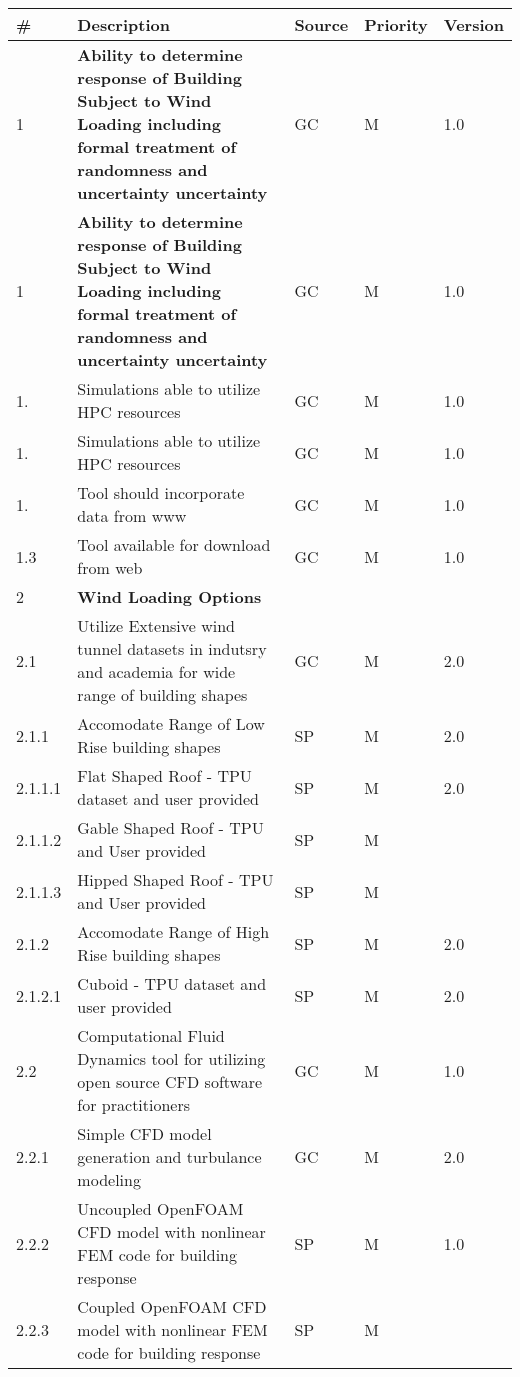 \begin{longtable}{| p{} | p{} | p{} | p{} |  p{} |}
                               \toprule
       \# & Description & Source & Priority & Version \\ \hline
1 & \textbf{Ability to determine response of Building Subject to Wind Loading including formal treatment of randomness and uncertainty uncertainty} & GC & M & 1.0  \\ \hline
1 & \textbf{Ability to determine response of Building Subject to Wind Loading including formal treatment of randomness and uncertainty uncertainty} & GC & M & 1.0  \\ \hline
1. & Simulations able to utilize HPC resources & GC & M & 1.0 \\ \hline
1. & Simulations able to utilize HPC resources & GC & M & 1.0 \\ \hline
 1. & Tool should incorporate data from www & GC & M & 1.0 \\ \hline
 1.3 & Tool available for download from web & GC & M & 1.0 \\ \hline
          2 & \textbf{Wind Loading Options } &  &  \\ \hline
2.1 & Utilize Extensive wind tunnel datasets in indutsry and academia for wide range of building shapes & GC & M & 2.0 \\ \hline
2.1.1 & Accomodate Range of Low Rise building shapes & SP & M & 2.0 \\ \hline
2.1.1.1 & Flat Shaped Roof - TPU dataset and user provided & SP & M & 2.0 \\ \hline
2.1.1.2 & Gable Shaped Roof - TPU and User provided & SP & M & \\ \hline
2.1.1.3 & Hipped Shaped Roof - TPU and User provided & SP & M & \\ \hline
2.1.2 & Accomodate Range of High Rise building shapes & SP & M & 2.0 \\ \hline
2.1.2.1 & Cuboid  - TPU dataset and user provided & SP & M & 2.0 \\ \hline
2.2 & Computational Fluid Dynamics tool for utilizing open source CFD software for practitioners & GC & M & 1.0 \\ \hline
2.2.1 & Simple CFD model generation and turbulance modeling & GC & M & 2.0 \\ \hline
2.2.2 & Uncoupled OpenFOAM CFD model with nonlinear FEM code for building response & SP & M & 1.0 \\ \hline
2.2.3 & Coupled OpenFOAM CFD model with nonlinear FEM code for building response & SP & M &  \\ \hline

\end{longtable}
